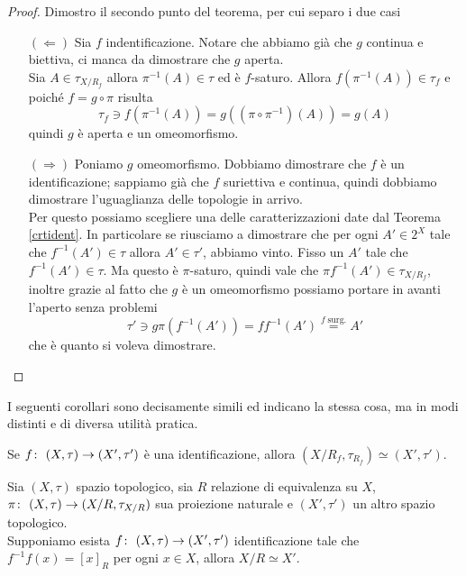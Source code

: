 \begin{proof}
	Dimostro il secondo punto del teorema, per cui separo i due casi
	\begin{enumerate}
		\item[$(\Leftarrow)$] Sia $f$ indentificazione. Notare che abbiamo già che $g$ continua e biettiva, ci manca da dimostrare che $g$ aperta. \\ Sia $A \in \tau_{X/R_f}$ allora $\pi^{-1}(A) \in \tau$ ed è $f$-saturo. Allora $f(\pi^{-1}(A)) \in \tau_f$ e poiché $f = g \circ \pi$ risulta 
		\begin{equation*}
			 \tau_f \ni f(\pi^{-1}(A)) = g ((\pi \circ \pi^{-1})(A)) = g(A)
		\end{equation*}
		quindi $g$ è aperta e un omeomorfismo.
		\item[$(\Rightarrow)$] Poniamo $g$ omeomorfismo. Dobbiamo dimostrare che $f$ è un identificazione; sappiamo già che $f$ suriettiva e continua, quindi dobbiamo dimostrare l'uguaglianza delle  topologie in arrivo. \\ Per questo possiamo scegliere una delle caratterizzazioni date dal Teorema \ref{crtident}. In particolare se riusciamo a dimostrare che per ogni $A' \in 2^X$ tale che $f^{-1}(A') \in \tau$ allora $A' \in \tau'$, abbiamo vinto. Fisso un $A'$ tale che $f^{-1}(A') \in \tau$. Ma questo è $\pi$-saturo, quindi vale che $\pi f^{-1} (A') \in \tau_{X/R_f}$, inoltre grazie al fatto che $g$ è un omeomorfismo possiamo portare in avanti l'aperto senza problemi
		\begin{equation*}
			\tau' \ni g\pi (f^{-1}(A')) = ff^{-1}(A') \overset{f \; \text{surg.}}{=} A' 
		\end{equation*}
		che è quanto si voleva dimostrare.
	\end{enumerate}
\end{proof}

I seguenti corollari sono decisamente simili ed indicano la stessa cosa, ma in modi distinti e di diversa utilità pratica. 

\begin{corollary}
	Se $f \colon\ (X,\tau) \rightarrow (X',\tau')$ è una identificazione, allora $(X/R_f, \tau_{R_f}) \simeq (X', \tau')$. 
\end{corollary}

\begin{corollary}
	Sia $(X,\tau)$ spazio topologico, sia $R$ relazione di equivalenza su $X$, $\pi \colon\ (X,\tau) \rightarrow (X/R, \tau_{X/R})$ sua proiezione naturale e $(X', \tau')$ un altro spazio topologico. \\ Supponiamo esista $f \colon\ (X,\tau) \rightarrow (X',\tau')$ identificazione tale che $f^{-1}f(x) = \left[x\right]_R$ per ogni $x \in X$, allora $X/R \simeq X'$.
\end{corollary}



